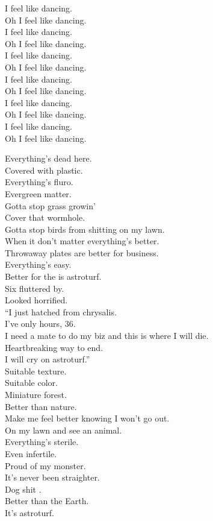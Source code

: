 I feel like dancing. \\
Oh I feel like dancing. \\
I feel like dancing. \\
Oh I feel like dancing. \\
I feel like dancing. \\
Oh I feel like dancing. \\
I feel like dancing. \\
Oh I feel like dancing. \\
I feel like dancing. \\
Oh I feel like dancing. \\
I feel like dancing. \\
Oh I feel like dancing. \\




Everything's dead here. \\
Covered with plastic. \\
Everything's fluro. \\
Evergreen matter. \\
Gotta stop grass growin' \\
Cover that wormhole. \\
Gotta stop birds from shitting on my lawn. \\
When it don't matter everything's better. \\
Throwaway plates are better for business. \\
Everything's easy. \\
Better for the  is astroturf. \\

Six  fluttered by. \\
Looked horrified. \\
``I just hatched from chrysalis. \\
I've only hours, 36. \\
I need a mate to do my biz and this is where I will die. \\
Heartbreaking way to end. \\
I will cry on astroturf.'' \\

Suitable texture. \\
Suitable color. \\
Miniature forest. \\
Better than nature. \\
Make me feel better knowing I won't go out. \\
On my lawn and see an animal. \\
Everything's sterile. \\
Even infertile. \\
Proud of my monster. \\
It's never been straighter. \\
Dog shit . \\
Better than the Earth. \\
It's astroturf. \\

